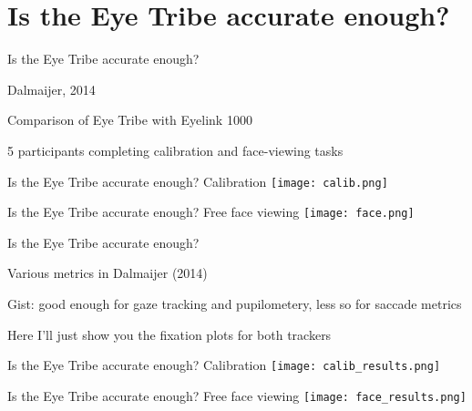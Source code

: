 \documentclass[unknownkeysallowed]{beamer}
\newenvironment{itemize*}%
  {\begin{itemize}%
    \setlength{\itemsep}{15pt}%
    \setlength{\parskip}{0pt}}%
  {\end{itemize}}
\begin{document}
\section{Is the Eye Tribe accurate enough?}
\begin{frame}{Is the Eye Tribe accurate enough?}
\begin{itemize*}
\item<1->{Dalmaijer, 2014}
\item<2->{Comparison of Eye Tribe with Eyelink 1000}
\item<3->{5 participants completing calibration  and face-viewing tasks}
\end{itemize*}
\end{frame}
\begin{frame}{Is the Eye Tribe accurate enough?}
Calibration
\centering
\texttt{[image: calib.png]}
\end{frame}
\begin{frame}{Is the Eye Tribe accurate enough?}
Free face viewing
\centering
\texttt{[image: face.png]}
\end{frame}
\begin{frame}{Is the Eye Tribe accurate enough?}
\begin{itemize*}
\item<1->{Various metrics in Dalmaijer (2014)}
\item<2->{Gist: good enough for gaze tracking and pupilometery, less so for saccade metrics}
\item<3->{Here I'll just show you the fixation plots for both trackers}
\end{itemize*}
\end{frame}
\begin{frame}{Is the Eye Tribe accurate enough?}
Calibration
\centering
\texttt{[image: calib\_results.png]}
\end{frame}
\begin{frame}{Is the Eye Tribe accurate enough?}
Free face viewing
\centering
\texttt{[image: face\_results.png]}
\end{frame}
\end{document}
